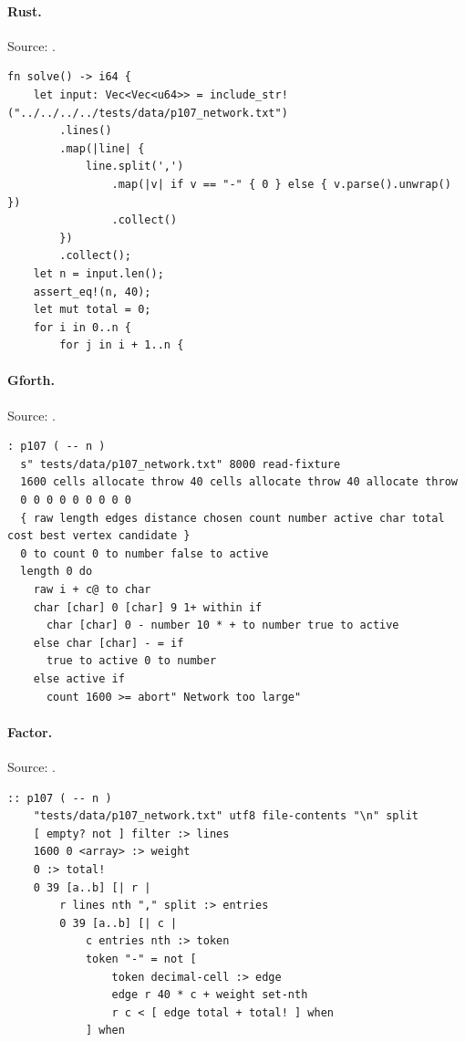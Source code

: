 \paragraph{Rust.} Source: .
\begin{lstlisting}
fn solve() -> i64 {
    let input: Vec<Vec<u64>> = include_str!("../../../../tests/data/p107_network.txt")
        .lines()
        .map(|line| {
            line.split(',')
                .map(|v| if v == "-" { 0 } else { v.parse().unwrap() })
                .collect()
        })
        .collect();
    let n = input.len();
    assert_eq!(n, 40);
    let mut total = 0;
    for i in 0..n {
        for j in i + 1..n {
\end{lstlisting}

\paragraph{Gforth.} Source: .
\begin{lstlisting}
: p107 ( -- n )
  s" tests/data/p107_network.txt" 8000 read-fixture
  1600 cells allocate throw 40 cells allocate throw 40 allocate throw
  0 0 0 0 0 0 0 0 0
  { raw length edges distance chosen count number active char total cost best vertex candidate }
  0 to count 0 to number false to active
  length 0 do
    raw i + c@ to char
    char [char] 0 [char] 9 1+ within if
      char [char] 0 - number 10 * + to number true to active
    else char [char] - = if
      true to active 0 to number
    else active if
      count 1600 >= abort" Network too large"
\end{lstlisting}

\paragraph{Factor.} Source: .
\begin{lstlisting}
:: p107 ( -- n )
    "tests/data/p107_network.txt" utf8 file-contents "\n" split
    [ empty? not ] filter :> lines
    1600 0 <array> :> weight
    0 :> total!
    0 39 [a..b] [| r |
        r lines nth "," split :> entries
        0 39 [a..b] [| c |
            c entries nth :> token
            token "-" = not [
                token decimal-cell :> edge
                edge r 40 * c + weight set-nth
                r c < [ edge total + total! ] when
            ] when
\end{lstlisting}

